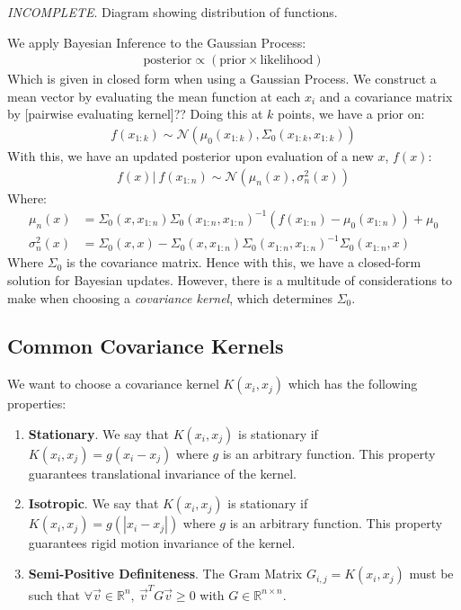 \documentclass[paper=a4, fontsize=12pt]{scrartcl} %
\numberwithin{equation}{section} %
\numberwithin{figure}{section} %
\numberwithin{table}{section} %
\begin{document}
\textit{INCOMPLETE}. Diagram showing distribution of functions.

We apply Bayesian Inference to the Gaussian Process:
\begin{align*}
    \text{posterior} \propto (\text{prior} \times \text{likelihood})
\end{align*}
Which is given in closed form when using a Gaussian Process. We construct a mean vector by evaluating the mean function at each $x_i$ and a covariance matrix by [pairwise evaluating kernel]?? Doing this at $k$ points, we have a prior on:
\begin{align*}
    f(x_{1:k}) \sim \mathcal{N}(\mu_0(x_{1:k}), \Sigma_0(x_{1:k}, x_{1:k}))
\end{align*}
With this, we have an updated posterior upon evaluation of a new $x$, $f(x)$:
\begin{align*}
    f(x) |\ f(x_{1:n}) \sim \mathcal{N}(\mu_n(x), \sigma^2_n(x))
\end{align*}
Where:
\begin{align*}
    \mu_n(x) &= \Sigma_0(x, x_{1:n}) \Sigma_0(x_{1:n}, x_{1:n})^{-1} \left( f(x_{1:n}) - \mu_0(x_{1:n}) \right) + \mu_0 \\
    \sigma_n^2(x) &= \Sigma_0(x, x) - \Sigma_0(x, x_{1:n}) \Sigma_0(x_{1:n}, x_{1:n})^{-1} \Sigma_0(x_{1:n}, x)
\end{align*}
Where $\Sigma_0$ is the covariance matrix. Hence with this, we have a closed-form solution for Bayesian updates. However, there is a multitude of considerations to make when choosing 
a \textit{covariance kernel}, which determines $\Sigma_0$.

\pagebreak

\subsection{Common Covariance Kernels}
We want to choose a covariance kernel $K(x_i, x_j)$ which has the following properties:
\begin{enumerate}
    \item \textbf{Stationary}. We say that $K(x_i, x_j)$ is stationary if $K(x_i, x_j) = g(x_i - x_j)$ where $g$ is an arbitrary function. This property guarantees 
    translational invariance of the kernel.

    \item \textbf{Isotropic}. We say that $K(x_i, x_j)$ is stationary if $K(x_i, x_j) = g(|x_i - x_j|)$ where $g$ is an arbitrary function. This property guarantees 
    rigid motion invariance of the kernel.

    \item \textbf{Semi-Positive Definiteness}. The Gram Matrix $G_{i,j} = K(x_i, x_j)$ must be such that $\forall \vec{v} \in \mathbb{R}^n,\ \vec{v}^T G \vec{v} \geq 0$ with $G \in \mathbb{R}^{n \times n}$.
\end{enumerate}
\end{document}

